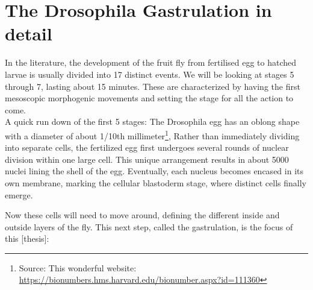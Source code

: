 



\newpage
\section{The Drosophila Gastrulation in detail}
In the literature, the development of the fruit fly from fertilised egg to hatched larvae is usually divided into 17 distinct events.\cite{bownes1975photographic} We will be looking at stages 5 through 7, lasting about 15 minutes. These are characterized by having the first mesoscopic morphogenic movements and setting the stage for all the action to come.\\
A quick run down of the first 5 stages:
The Drosophila egg has an oblong shape with a diameter of about 1/10th millimeter\footnote{Source: This wonderful website: \url{https://bionumbers.hms.harvard.edu/bionumber.aspx?id=111360}}, 
Rather than immediately dividing into separate cells, the fertilized egg first undergoes several rounds of nuclear division within one large cell. This unique arrangement results in about 5000 nuclei lining the shell of the egg. Eventually, each nucleus becomes encased in its own membrane, marking the cellular blastoderm stage, where distinct cells finally emerge.


Now these cells will need to move around, defining the different inside and outside layers of the fly. This next step, called the gastrulation, is the focus of this [thesis]:

